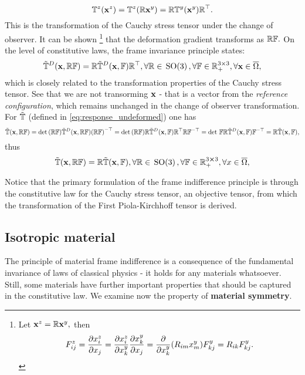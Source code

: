 \documentclass[11pt]{scrartcl} %
\begin{document}
\[
	\mathbb{T}^z\qty(\vb{x}^{z}) = \mathbb{T}^z\qty(\mathbb{R}\vb{x}^{y}) =  \mathbb{R} \mathbb{T}^{y}\qty(\vb{x}^{y}) \mathbb{R}^\top.
\]
This is the transformation of the Cauchy stress tensor under the change of observer. It can be shown \footnote{Let $\vb{x}^z = \mathbb{R} \vb{x}^{y},$ then
	\[
		F^z_{ij} = \pdv{x^z_i}{x_j} = \pdv{x^z_i}{x^y_k}\pdv{x^y_k}{x_j} = \pdv{x^y_k}\qty(R_{im}x^{y}_m)F^y_{kj} = R_{ik} F^y_{kj}.
	\]
} that the deformation gradient transforms as $\mathbb{R}\mathbb{F}.$ On the level of constitutive laws, the frame invariance principle states:
\[
	\tilde{\mathbb{T}}^D\qty(\vb{x}, \mathbb{R} \mathbb{F}) = \mathbb{R}\tilde{\mathbb{T}}^D\qty(\vb{x},\mathbb{F})\mathbb{R}^\top, \forall \mathbb{R}\in \, \text{SO(3)} \,, \forall \mathbb{F} \in {\mathbb R}^{3 \times 3}_+, \forall \vb{x}\in \overline{\Omega},
\]
which is closely related to the transformation properties of the Cauchy stress tensor. See that we are not transorming $\vb{x}$ - that is a vector from the \textit{reference configuration}, which remains unchanged in the change of observer transformation. For $\tilde{\mathbb{T}}$ (defined in \ref{eq:response_undeformed}) one has
\[
	\tilde{\mathbb{T}}\qty(\vb{x}, \mathbb{R} \mathbb{F}) = \det\qty(\mathbb{R} \mathbb{F}) \tilde{\mathbb{T}}^D\qty(\vb{x}, \mathbb{R}\mathbb{F})\qty(\mathbb{R} \mathbb{F})^{-\top} = \det\qty(\mathbb{R} \mathbb{F}) \mathbb{R} \tilde{\mathbb{T}}^D(\vb{x},\mathbb{F}) \mathbb{R}^\top \mathbb{R} \mathbb{F}^{-\top} = \det\, \mathbb{F} \mathbb{R}\tilde{\mathbb{T}}^D\qty(\vb{x},\mathbb{F})\mathbb{F}^{-\top}=\mathbb{R}\tilde{\mathbb{T}}\qty(\vb{x},\mathbb{F}),
\]
thus
\[
	\tilde{\mathbb{T}}\qty(\vb{x}, \mathbb{R} \mathbb{F}) = \mathbb{R}\tilde{\mathbb{T}}\qty(\vb{x},\mathbb{F}), \forall \mathbb{R} \in \, \text{SO(3)} \,, \forall \mathbb{F} \in {\mathbb R}^{3 \cross 3}_+, \forall x \in \overline{\Omega},
\]

Notice that the primary formulation of the frame indifference principle is through the constitutive law for the Cauchy stress tensor, an objective tensor, from which the transformation of the First Piola-Kirchhoff tensor is derived.

\subsection{Isotropic material}
\label{sec:isotropic_materials}
The principle of material frame indifference is a consequence of the fundamental invariance of laws of classical physics - it holds for any materials whatsoever. Still, some materials have further important properties that should be captured in the constitutive law. We examine now the property of \textbf{material symmetry}.
\end{document}

